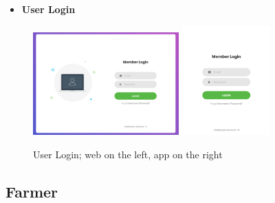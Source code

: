 \documentclass{article}
\begin{document}
    \begin{itemize}
        \item \textbf{User Login}
    \end{itemize}
        \begin{figure} [h]
            \centering
            \includegraphics[width=0.5\textwidth]{images/UserInterfaces/UserLoginWeb.png}
            \quad
            \includegraphics[width=0.3\textwidth]{images/UserInterfaces/UserLoginApp.png}
            \quad
            \caption{\label{fig:userLogin}User Login; web on the left, app on the right}
        \end{figure}
    
    
    \newpage
    
    
    \subsection{Farmer}
    
\end{document}
